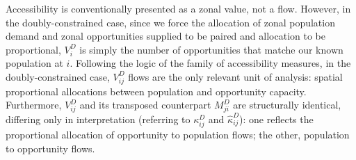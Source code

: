 \documentclass[
  10pt,
  letterpaper,
]{article}
\begin{document}
\begin{table}

\caption{\label{tbl-adjusted-small-system-land-use-doubly-constrained-case-allfs-access-values-for-zone2}Doubly-constrained
accessible opportunities at Zone 2 for all travel decay groups in the
modified simple system.}


\end{table}%

Accessibility is conventionally presented as a zonal value, not a flow.
However, in the doubly-constrained case, since we force the allocation
of zonal population demand and zonal opportunities supplied to be paired
and allocation to be proportional, \(V_i^D\) is simply the number of
opportunities that matche our known population at \(i\). Following the
logic of the family of accessibility measures, in the doubly-constrained
case, \(V_{ij}^D\) flows are the only relevant unit of analysis: spatial
proportional allocations between population and opportunity capacity.
Furthermore, \(V^D_{ij}\) and its transposed counterpart \(M^D_{ji}\)
are structurally identical, differing only in interpretation (referring
to \(\kappa_{ij}^D\) and \(\hat \kappa_{ij}^D\)): one reflects the
proportional allocation of opportunity to population flows; the other,
population to opportunity flows.
\end{document}
